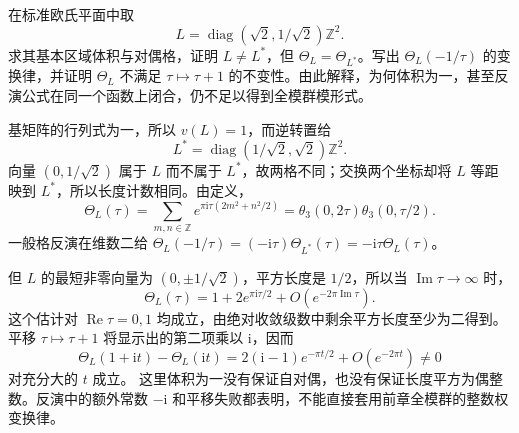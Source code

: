 \begin{optionalexercise}\label{b3:ex:24-7}
在标准欧氏平面中取
\[
L=\operatorname{diag}(\sqrt2,1/\sqrt2)\mathbb Z^2.
\]
求其基本区域体积与对偶格，证明 \(L\ne L^*\)，但
\(\Theta_L=\Theta_{L^*}\)。写出 \(\Theta_L(-1/\tau)\) 的变换律，并证明 \(\Theta_L\) 不满足 \(\tau\mapsto\tau+1\) 的不变性。由此解释，为何体积为一，甚至反演公式在同一个函数上闭合，仍不足以得到全模群模形式。
\end{optionalexercise}
\begin{solution}
基矩阵的行列式为一，所以 \(v(L)=1\)，而逆转置给
\[
L^*=\operatorname{diag}(1/\sqrt2,\sqrt2)\mathbb Z^2.
\]
向量 \((0,1/\sqrt2)\) 属于 \(L\) 而不属于 \(L^*\)，故两格不同；交换两个坐标却将 \(L\) 等距映到 \(L^*\)，所以长度计数相同。由定义，
\[
\Theta_L(\tau)
=\sum_{m,n\in\mathbb Z}e^{\pi\mathrm{i}\tau(2m^2+n^2/2)}
=\theta_3(0,2\tau)\theta_3(0,\tau/2).
\]
一般格反演在维数二给
\(\Theta_L(-1/\tau)=(-\mathrm{i}\tau)\Theta_{L^*}(\tau)
=-\mathrm{i}\tau\Theta_L(\tau)\)。

但 \(L\) 的最短非零向量为 \((0,\pm1/\sqrt2)\)，平方长度是 \(1/2\)，所以当 \(\operatorname{Im}\tau\to\infty\) 时，
\[
\Theta_L(\tau)=1+2e^{\pi\mathrm{i}\tau/2}
                 +O(e^{-2\pi\operatorname{Im}\tau}).
\]
这个估计对 \(\operatorname{Re}\tau=0,1\) 均成立，由绝对收敛级数中剩余平方长度至少为二得到。
平移 \(\tau\mapsto\tau+1\) 将显示出的第二项乘以 \(\mathrm{i}\)，因而
\[
\Theta_L(1+\mathrm{i}t)-\Theta_L(\mathrm{i}t)
=2(\mathrm{i}-1)e^{-\pi t/2}+O(e^{-2\pi t})\ne0
\]
对充分大的 \(t\) 成立。
这里体积为一没有保证自对偶，也没有保证长度平方为偶整数。反演中的额外常数 \(-\mathrm{i}\) 和平移失败都表明，不能直接套用前章全模群的整数权变换律。
\end{solution}

